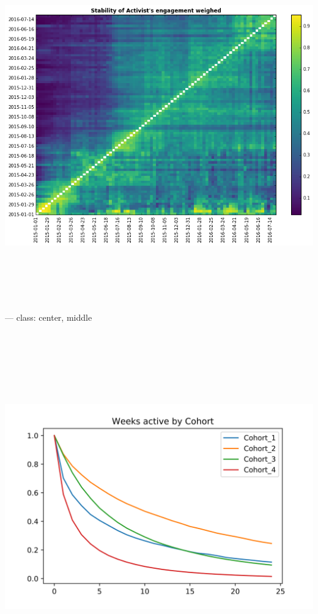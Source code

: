 \documentclass[ignorenonframetext,]{beamer}
\begin{document}
\begin{frame}
\includegraphics[width=7.29167in,height=6.25000in]{stability_of_activist_engagement.png
} --- class: center, middle
\includegraphics[width=7.29167in,height=6.25000in]{Survival function of Activist by Gender.svg}

\end{frame}
\end{document}

